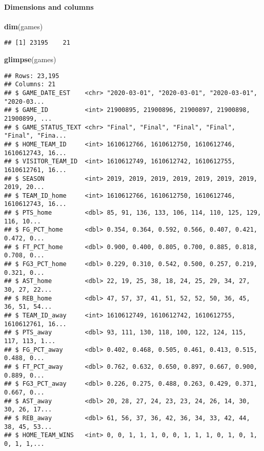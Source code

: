 \documentclass[
]{article}
\newenvironment{Shaded}{\begin{snugshade}}{\end{snugshade}}
\newcommand{\KeywordTok}[1]{\textcolor[rgb]{0.13,0.29,0.53}{\textbf{#1}}}
\newcommand{\NormalTok}[1]{#1}
\begin{document}
\hypertarget{dimensions-and-columns}{%
\paragraph{Dimensions and columns}\label{dimensions-and-columns}}

\begin{Shaded}
\begin{Highlighting}[]
\KeywordTok{dim}\NormalTok{(games)}
\end{Highlighting}
\end{Shaded}

\begin{verbatim}
## [1] 23195    21
\end{verbatim}

\begin{Shaded}
\begin{Highlighting}[]
\KeywordTok{glimpse}\NormalTok{(games)}
\end{Highlighting}
\end{Shaded}

\begin{verbatim}
## Rows: 23,195
## Columns: 21
## $ GAME_DATE_EST    <chr> "2020-03-01", "2020-03-01", "2020-03-01", "2020-03...
## $ GAME_ID          <int> 21900895, 21900896, 21900897, 21900898, 21900899, ...
## $ GAME_STATUS_TEXT <chr> "Final", "Final", "Final", "Final", "Final", "Fina...
## $ HOME_TEAM_ID     <int> 1610612766, 1610612750, 1610612746, 1610612743, 16...
## $ VISITOR_TEAM_ID  <int> 1610612749, 1610612742, 1610612755, 1610612761, 16...
## $ SEASON           <int> 2019, 2019, 2019, 2019, 2019, 2019, 2019, 2019, 20...
## $ TEAM_ID_home     <int> 1610612766, 1610612750, 1610612746, 1610612743, 16...
## $ PTS_home         <dbl> 85, 91, 136, 133, 106, 114, 110, 125, 129, 116, 10...
## $ FG_PCT_home      <dbl> 0.354, 0.364, 0.592, 0.566, 0.407, 0.421, 0.472, 0...
## $ FT_PCT_home      <dbl> 0.900, 0.400, 0.805, 0.700, 0.885, 0.818, 0.708, 0...
## $ FG3_PCT_home     <dbl> 0.229, 0.310, 0.542, 0.500, 0.257, 0.219, 0.321, 0...
## $ AST_home         <dbl> 22, 19, 25, 38, 18, 24, 25, 29, 34, 27, 30, 27, 22...
## $ REB_home         <dbl> 47, 57, 37, 41, 51, 52, 52, 50, 36, 45, 36, 51, 54...
## $ TEAM_ID_away     <int> 1610612749, 1610612742, 1610612755, 1610612761, 16...
## $ PTS_away         <dbl> 93, 111, 130, 118, 100, 122, 124, 115, 117, 113, 1...
## $ FG_PCT_away      <dbl> 0.402, 0.468, 0.505, 0.461, 0.413, 0.515, 0.488, 0...
## $ FT_PCT_away      <dbl> 0.762, 0.632, 0.650, 0.897, 0.667, 0.900, 0.889, 0...
## $ FG3_PCT_away     <dbl> 0.226, 0.275, 0.488, 0.263, 0.429, 0.371, 0.667, 0...
## $ AST_away         <dbl> 20, 28, 27, 24, 23, 23, 24, 26, 14, 30, 30, 26, 17...
## $ REB_away         <dbl> 61, 56, 37, 36, 42, 36, 34, 33, 42, 44, 38, 45, 53...
## $ HOME_TEAM_WINS   <int> 0, 0, 1, 1, 1, 0, 0, 1, 1, 1, 0, 1, 0, 1, 0, 1, 1,...
\end{verbatim}
\end{document}

